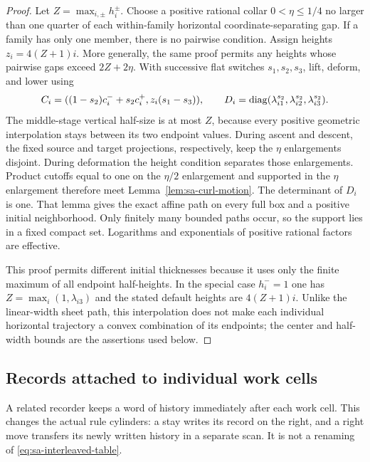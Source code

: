 \begin{proof}
Let $Z=\max_{i,\pm}h_i^\pm$. Choose a positive rational collar
$0<\eta\le1/4$ no larger than one quarter of each within-family horizontal
coordinate-separating gap. If a family has only one member, there is no
pairwise condition. Assign heights $z_i=4(Z+1)i$. More generally, the
same proof permits any heights whose pairwise gaps exceed $2Z+2\eta$.
With successive flat switches $s_1,s_2,s_3$, lift, deform, and lower using
\[
 C_i=((1-s_2)c_i^-+s_2c_i^+,z_i(s_1-s_3)),\qquad
 D_i=\operatorname{diag}(\lambda_{i1}^{s_2},\lambda_{i2}^{s_2},\lambda_{i3}^{s_2}).
\]
The middle-stage vertical half-size is at most $Z$, because every
positive geometric interpolation stays between its two endpoint values.
During ascent and descent, the fixed source and target projections,
respectively, keep the $\eta$ enlargements disjoint. During deformation
the height condition separates those enlargements. Product cutoffs equal
to one on the $\eta/2$ enlargement and supported in the $\eta$
enlargement therefore meet Lemma~\ref{lem:sa-curl-motion}.
The determinant of $D_i$ is one. That lemma gives the exact affine path
on every full box and a positive initial neighborhood. Only finitely
many bounded paths occur, so the support lies in a fixed compact set.
Logarithms and exponentials of positive rational factors are effective.

This proof permits different initial thicknesses because it uses only
the finite maximum of all endpoint half-heights. In the special case
$h_i^-=1$ one has $Z=\max_i(1,\lambda_{i3})$ and the stated default
heights are $4(Z+1)i$. Unlike the linear-width sheet path, this
interpolation does not make each individual horizontal trajectory a
convex combination of its endpoints; the center and half-width bounds
are the assertions used below.
\end{proof}

\subsection{Records attached to individual work cells}\label{subsec:sa-cell-records}
A related recorder keeps a word of history immediately after each work
cell.  This changes the actual rule cylinders: a stay writes its record
on the right, and a right move transfers its newly written history in a
separate scan.  It is not a renaming of \eqref{eq:sa-interleaved-table}.

